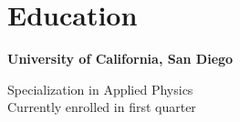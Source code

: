 \section{Education}

{\bf University of California, San Diego}
    \par\hspace*{10pt} Specialization in Applied Physics\\
    \hspace*{10pt} Currently enrolled in first quarter

